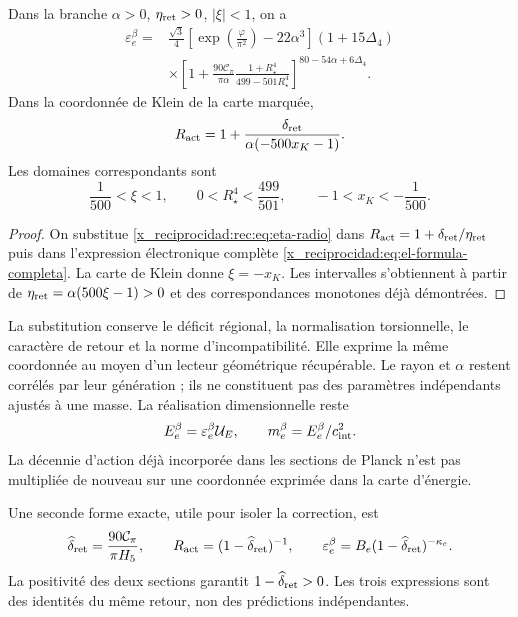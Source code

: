 \begin{corollary}
\label{x_reciprocidad:rec:cor:electron}
Dans la branche \(\alpha>0\), \(\eta_{\rm ret}>0\), \(|\xi|<1\), on a
\begin{align}
 \varepsilon_e^{\beta}={}&
 \frac{\sqrt3}{4}
 \left[\exp\!\left(\frac\varphi{\pi^2}\right)-22\alpha^3\right]
 (1+15\Delta_4)\nonumber\\
 &\times\left[1+\frac{90\mathcal C_\pi}{\pi\alpha}
 \frac{1+R_\star^4}{499-501R_\star^4}\right]^{80-54\alpha+6\Delta_4}.
 \label{x_reciprocidad:rec:eq:electron-radio}
\end{align}
Dans la coordonnée de Klein de la carte marquée,
\begin{equation}
 R_{\rm act}=1+
 \frac{\delta_{\rm ret}}{\alpha(-500x_K-1)}.
 \label{x_reciprocidad:rec:eq:accion-klein}
\end{equation}
Les domaines correspondants sont
\[
 \frac1{500}<\xi<1,\qquad
 0<R_\star^4<\frac{499}{501},\qquad
 -1<x_K<-\frac1{500}.
\]
\end{corollary}
\begin{proof}
On substitue \eqref{x_reciprocidad:rec:eq:eta-radio} dans \(R_{\rm act}=1+\delta_{\rm ret}/\eta_{\rm ret}\) puis dans l’expression électronique complète \eqref{x_reciprocidad:eq:el-formula-completa}. La carte de Klein donne \(\xi=-x_K\). Les intervalles s’obtiennent à partir de \(\eta_{\rm ret}=\alpha(500\xi-1)>0\) et des correspondances monotones déjà démontrées.

\end{proof}

La substitution conserve le déficit régional, la normalisation torsionnelle, le caractère de retour et la norme d'incompatibilité. Elle exprime la même coordonnée au moyen d'un lecteur géométrique récupérable. Le rayon et \(\alpha\) restent corrélés par leur génération ; ils ne constituent pas des paramètres indépendants ajustés à une masse. La réalisation dimensionnelle reste
\[
 E_e^{\beta}=\varepsilon_e^{\beta}\mathcal U_E,\qquad
 m_e^{\beta}=E_e^{\beta}/c_{\rm int}^2.
\]
La décennie d’action déjà incorporée dans les sections de Planck n’est pas multipliée de nouveau sur une coordonnée exprimée dans la carte d’énergie.

Une seconde forme exacte, utile pour isoler la correction, est
\[
 \widehat\delta_{\rm ret}=\frac{90\mathcal C_\pi}{\pi H_5},\qquad
 R_{\rm act}=(1-\widehat\delta_{\rm ret})^{-1},\qquad
 \varepsilon_e^{\beta}=B_e(1-\widehat\delta_{\rm ret})^{-\kappa_e}.
\]
La positivité des deux sections garantit \(1-\widehat\delta_{\rm ret}>0\). Les trois expressions sont des identités du même retour, non des prédictions indépendantes.


